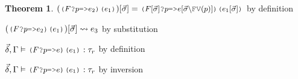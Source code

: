 \documentclass[acmsmall]{acmart}
\theoremstyle{definition}
\newtheorem{theorem}{Theorem}[section]
\begin{document}
\begin{theorem}
        \item \Z\Z\Z $(\J{($F$?$p$=>$e_2$)($e_1$)})[\vec{\sigma}] = \J{($F[\vec{\sigma}]$?$p$=>$e[\vec{\sigma}\backslash\text{FV}(p)]$)($e_1[\vec{\sigma}]$)}
        $ by definition
        \item \Z\Z\Z $(\J{($F$?$p$=>$e_2$)($e_1$)})[\vec{\sigma}] \rightsquigarrow e_3$ by substitution 

        \item \Z\Z\Z $\vec{\delta}, \Gamma \satisfies \J{($F$?$p$=>$e$)($e_1$)} \hastype \tau_r$ by definition
      \item \Z\Z $\vec{\delta}, \Gamma \satisfies \J{($F$?$p$=>$e$)($e_1$)} \hastype \tau_r$ by inversion 



\end{theorem}
\end{document}
